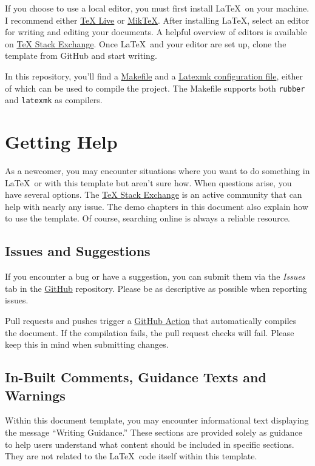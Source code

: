 If you choose to use a local editor, you must first install \LaTeX~on your machine. I recommend either \href{https://www.tug.org/texlive/}{TeX Live} or \href{https://miktex.org/}{MikTeX}. After installing \LaTeX, select an editor for writing and editing your documents. A helpful overview of editors is available on \href{https://tex.stackexchange.com/questions/339/latex-editors-ides}{TeX Stack Exchange}. Once \LaTeX~and your editor are set up, clone the template from GitHub and start writing.

\begin{block}[tip]
In this repository, you'll find a \href{https://github.com/pmdlt/epfl-thesis/blob/master/Makefile}{Makefile} and a \href{https://github.com/pmdlt/epfl-thesis/blob/master/.latexmkrc}{Latexmk configuration file}, either of which can be used to compile the project. The Makefile supports both \texttt{rubber} and \texttt{latexmk} as compilers.
\end{block}

\section{Getting Help}
As a newcomer, you may encounter situations where you want to do something in \LaTeX~or with this template but aren't sure how. When questions arise, you have several options. The \href{https://tex.stackexchange.com/}{TeX Stack Exchange} is an active community that can help with nearly any issue. The demo chapters in this document also explain how to use the template. Of course, searching online is always a reliable resource.

\subsection{Issues and Suggestions}
If you encounter a bug or have a suggestion, you can submit them via the \textit{Issues} tab in the \href{https://github.com/pmdlt/epfl-thesis}{GitHub} repository. Please be as descriptive as possible when reporting issues.

Pull requests and pushes trigger a \href{https://github.com/pmdlt/epfl-thesis/actions/workflows/latex.yml}{GitHub Action} that automatically compiles the document. If the compilation fails, the pull request checks will fail. Please keep this in mind when submitting changes.

\subsection{In-Built Comments, Guidance Texts and Warnings}
Within this document template, you may encounter informational text displaying the message ``Writing Guidance.'' These sections are provided solely as guidance to help users understand what content should be included in specific sections. They are not related to the \LaTeX~code itself within this template.

